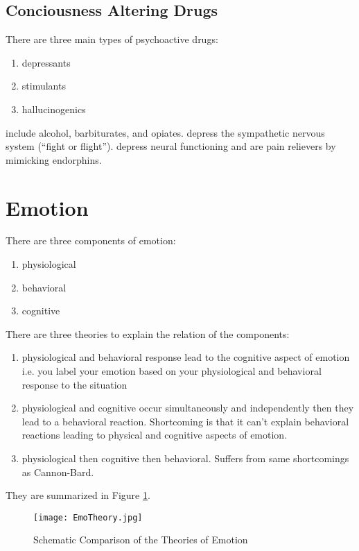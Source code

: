 \documentclass[../Psych_Soci_review.tex]{subfiles}
\begin{document}
\subsection{Conciousness Altering Drugs}
There are three main types of psychoactive drugs:
\begin{enumerate}
  \item depressants
  \item stimulants
  \item hallucinogenics
\end{enumerate}
 include alcohol, barbiturates, and opiates.
 depress the sympathetic nervous system (``fight or
flight'').  depress neural functioning and are pain relievers
by mimicking endorphins.

\section{Emotion}
There are three components of emotion:
\begin{enumerate}
  \item physiological 
  \item behavioral 
  \item cognitive
\end{enumerate}
There are three theories to explain the relation of the components:
\begin{enumerate}
  \item {} physiological and behavioral response lead
    to the cognitive aspect of emotion i.e. you label your emotion based on your
    physiological and behavioral response to the situation
  \item {} physiological and cognitive occur
    simultaneously and independently then they lead to a behavioral reaction.
    Shortcoming is that it can't explain behavioral reactions leading to
    physical and cognitive aspects of emotion.
  \item {} physiological then cognitive then
    behavioral. Suffers from same shortcomings as Cannon-Bard.
\end{enumerate}
They are summarized in Figure \ref{fig:emo}.
\begin{figure}[H]
  \centering
  \texttt{[image: EmoTheory.jpg]}
  \caption{Schematic Comparison of the Theories of Emotion}
  \label{fig:emo}
\end{figure}
\end{document}
